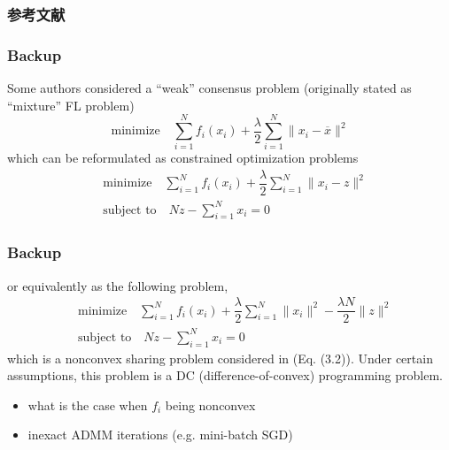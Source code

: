 




\begin{frame}[allowframebreaks]
\frametitle{参考文献}

{\footnotesize


}

\end{frame}


\begin{frame}
\frametitle{Backup}

Some authors considered a {\color{red} ``weak'' consensus problem} (originally stated as ``mixture'' FL problem)
$$\text{minimize} \quad \sum\limits_{i=1}^N f_i(x_i) + \dfrac{\lambda}{2} \sum\limits_{i=1}^N \lVert x_i - \overline{x} \rVert^2$$
which can be reformulated as constrained optimization problems
\begin{align*}
    & \text{minimize} \quad \sum\limits_{i=1}^N f_i(x_i) + \dfrac{\lambda}{2} \sum\limits_{i=1}^N \lVert x_i - z \rVert^2 \\
    & \text{subject to} \quad Nz - \sum\limits_{i=1}^N x_i = 0
\end{align*}

\end{frame}


\begin{frame}
\frametitle{Backup}

or equivalently as the following problem,
\begin{align*}
    & \text{minimize} \quad \sum\limits_{i=1}^N f_i(x_i) + \dfrac{\lambda}{2} \sum\limits_{i=1}^N \lVert x_i \rVert^2 -\dfrac{\lambda N}{2} \lVert z \rVert^2 \\
    & \text{subject to} \quad Nz - \sum\limits_{i=1}^N x_i = 0
\end{align*}
which is a nonconvex sharing problem considered in \cite{hong2016convergence} (Eq. (3.2)). Under certain assumptions, this problem is a DC (difference-of-convex) programming problem.

\begin{question}
\begin{itemize}
    \item what is the case when $f_i$ being nonconvex
    \item inexact ADMM iterations (e.g. mini-batch SGD)
\end{itemize}
\end{question}

\end{frame}

